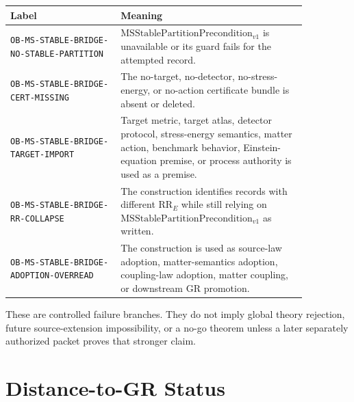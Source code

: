 \documentclass[11pt]{article}
\newcommand{\MSStablePre}{\mathrm{MSStablePartitionPrecondition}_{v1}}
\begin{document}
\begin{longtable}{p{0.32\linewidth}p{0.54\linewidth}}
\toprule
Label & Meaning \\
\midrule
\texttt{OB-MS-STABLE-BRIDGE-NO-STABLE-PARTITION} &
\(\MSStablePre\) is unavailable or its guard fails for the attempted record. \\
\texttt{OB-MS-STABLE-BRIDGE-CERT-MISSING} &
The no-target, no-detector, no-stress-energy, or no-action certificate bundle
is absent or deleted. \\
\texttt{OB-MS-STABLE-BRIDGE-TARGET-IMPORT} &
Target metric, target atlas, detector protocol, stress-energy semantics,
matter action, benchmark behavior, Einstein-equation premise, or process
authority is used as a premise. \\
\texttt{OB-MS-STABLE-BRIDGE-RR-COLLAPSE} &
The construction identifies records with different \(\mathrm{RR}_E\) while
still relying on \(\MSStablePre\) as written. \\
\texttt{OB-MS-STABLE-BRIDGE-ADOPTION-OVERREAD} &
The construction is used as source-law adoption, matter-semantics adoption,
coupling-law adoption, matter coupling, or downstream GR promotion. \\
\bottomrule
\end{longtable}

These are controlled failure branches. They do not imply global theory
rejection, future source-extension impossibility, or a no-go theorem unless a
later separately authorized packet proves that stronger claim.

\section{Distance-to-GR Status}
\end{document}
